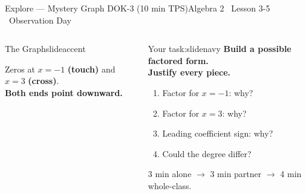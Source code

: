 \documentclass[aspectratio=169, 11pt]{beamer}
\begin{document}
\begin{frame}{Explore --- Mystery Graph DOK-3 (10 min TPS)}{Algebra 2 \textperiodcentered\ Lesson 3-5 \textperiodcentered\ Observation Day}
\vspace{0.1cm}
\begin{columns}[T]
\begin{projcard}{The Graph}{slideaccent}
\begin{center}
\end{center}
\small Zeros at $x=-1$ \textbf{(touch)} and $x=3$ \textbf{(cross)}.\\
\textbf{Both ends point downward.}
\end{projcard}

\begin{projcard}{Your task:}{slidenavy}
\textbf{Build a possible factored form.}\\
\textbf{Justify every piece.}

\vspace{0.25cm}
\begin{enumerate}
  \setlength{\itemsep}{0.15cm}
  \item Factor for $x=-1$: why?
  \item Factor for $x=3$: why?
  \item Leading coefficient sign: why?
  \item Could the degree differ?
\end{enumerate}

\vspace{0.2cm}
\small\textcolor{slidegray}{3 min alone $\rightarrow$ 3 min partner
$\rightarrow$ 4 min whole-class.}
\end{projcard}

\end{columns}
\end{frame}
\end{document}
